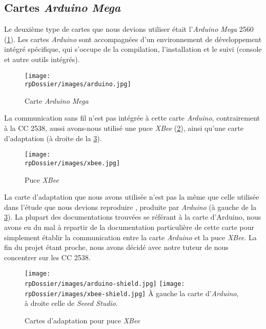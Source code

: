 \subsection{Cartes \emph{Arduino Mega}}

Le deuxième type de cartes que nous devions utiliser était l’\emph{Arduino Mega} 2560 (\cref{arduino}).
Les cartes \emph{Arduino} sont accompagnées d’un environnement de développement intégré spécifique, qui s’occupe de la compilation, l’installation et le suivi (console et autre outils intégrés).

\begin{figure}[H]
\centering
\texttt{[image: \\rpDossier/images/arduino.jpg]}
\caption{Carte \emph{Arduino Mega}}
\label{arduino}
\end{figure}

La communication sans fil n’est pas intégrée à cette carte \emph{Arduino}, contrairement à la CC 2538, aussi avons-nous utilisé une puce \emph{XBee} (\cref{xbee}), ainsi qu’une carte d’adaptation (à droite de la \cref{xbee-shields}).

\begin{figure}[H]
\centering
\texttt{[image: \\rpDossier/images/xbee.jpg]}
\caption{Puce \emph{XBee}}
\label{xbee}
\end{figure}

La carte d’adaptation que nous avons utilisée n’est pas la même que celle utilisée dans l’étude que nous devions reproduire \cite{eymery}, produite par \emph{Arduino} (à gauche de la \cref{xbee-shields}).
La plupart des documentations trouvées se référant à la carte d’Arduino, nous avons eu du mal à repartir de la documentation particulière de cette carte  pour simplement établir la communication entre la carte \emph{Arduino} et la puce \emph{XBee}. La fin du projet étant proche, nous avons décidé avec notre tuteur de nous concentrer sur les CC 2538.

\begin{figure}[H]
\centering
\texttt{[image: \\rpDossier/images/arduino-shield.jpg]}
\texttt{[image: \\rpDossier/images/xbee-shield.jpg]}
\newline
À gauche la carte d’\emph{Arduino}, à droite celle de \emph{Seeed Studio}.
\caption{Cartes d’adaptation pour puce \emph{XBee}}
\label{xbee-shields}
\end{figure}
